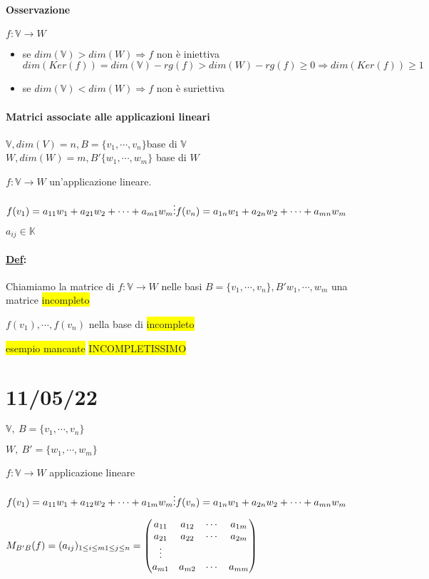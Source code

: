 \documentclass{article}
\newcommand{\hl}[1]{\colorbox{yellow}{#1}}
\newcommand{\ul}[1]{\underline{#1}}
\newcommand{\K}{\mathbb{K}}
\newcommand{\V}{\mathbb{V}}
\newcommand{\Def}[2]{\paragraph{\ul{Def}:}#1\\\hspace*{3em}\begin{minipage}{.8\textwidth}#2\end{minipage}}
\begin{document}
	\paragraph{Osservazione}

$f:\V\rightarrow W$
	\begin{itemize}
		\item se $dim(\V)>dim(W)\Rightarrow f$ non è iniettiva\\
		      $dim(Ker(f))=dim(\V)-rg(f)>dim(W)-rg(f)\ge0\Rightarrow dim(Ker(f))\ge1$
		\item se $dim(\V)<dim(W)\Rightarrow f$ non è suriettiva
	\end{itemize}

	\paragraph{Matrici associate alle applicazioni lineari}

$\V,dim(V)=n,B=\{v_1,\cdots,v_n\}$base di $\V$\\$W,dim(W)=m,B'\{w_1,\cdots,w_m\}$ base di $W$

$f:\V\rightarrow W$ un'applicazione lineare.

$f(v_1)=a_{11}w_1+a_{21}w_2+\cdots+a_{m1}w_m\\
	\vdots\\
	f(v_n)=a_{1n}w_1+a_{2n}w_2+\cdots+a_{mn}w_m$

$a_{ij}\in\K$

\Def{Chiamiamo la matrice di $f:\V\rightarrow W$ nelle basi $B=\{v_1,\cdots,v_n\},B'{w_1,\cdots,w_m}$ una matrice \hl{incompleto}}{
$f(v_1),\cdots,f(v_n)$ nella base di \hl{incompleto}
}

\hl{esempio mancante}
\hl{INCOMPLETISSIMO}
\section{11/05/22}

$\V,\ B=\{v_1,\cdots,v_n\}$

$W,\ B'=\{w_1,\cdots,w_m\}$

$f:\V\rightarrow W$ applicazione lineare

$f(v_1)=a_{11}w_1+a_{12}w_2+\cdots+a_{1m}w_m
	\\\vdots\\
	f(v_n)=a_{1n}w_1+a_{2n}w_2+\cdots+a_{mn}w_m$

$M_{B'B}(f)=(a_{ij})_{1\le i\le m\\1\le j\le n}=\begin{pmatrix}
		a_{11} & a_{12} & \cdots & a_{1m} \\
		a_{21} & a_{22} & \cdots & a_{2m} \\
		\vdots                            \\
		a_{m1} & a_{m2} & \cdots & a_{mm}
	\end{pmatrix}$
\end{document}
